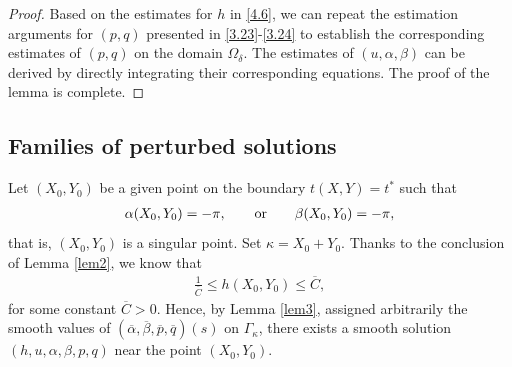 \documentclass[11pt,reqno]{article}
\newcommand{\fr}{\frac}
\numberwithin{equation}{section}
\begin{document}
\begin{proof}
Based on the estimates for $h$ in \eqref{4.6}, we can repeat the estimation arguments for $(p,q)$ presented in \eqref{3.23}-\eqref{3.24} to establish the corresponding estimates of $(p,q)$ on the domain $\Omega_\delta$. The estimates of $(u, \alpha, \beta)$ can be derived by directly integrating their corresponding equations.
The proof of the lemma is complete.
\end{proof}


\subsection{Families of perturbed solutions}\label{S42}

Let $(X_0,Y_0)$ be a given point on the boundary $t(X,Y)=t^*$ such that
\begin{align}\label{4.12}
\alpha(X_0, Y_0)=-\pi,\qquad {\rm or}\qquad \beta(X_0, Y_0)=-\pi,
\end{align}
that is, $(X_0,Y_0)$ is a singular point. Set $\kappa=X_0+Y_0$. Thanks to the conclusion of Lemma \ref{lem2}, we know that
\begin{align}\label{4.13}
\fr{1}{\overline{C}}\leq h(X_0, Y_0)\leq \overline{C},
\end{align}
for some constant $\overline{C}>0$. Hence, by Lemma \ref{lem3}, assigned arbitrarily the smooth values of $(\overline{\alpha}, \overline{\beta}, \overline{p}, \overline{q})(s)$ on $\Gamma_\kappa$, there exists a smooth solution $(h, u, \alpha, \beta, p, q)$ near the point $(X_0,Y_0)$.
\end{document}
